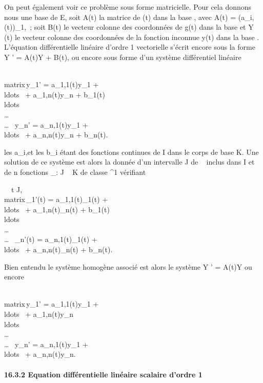 \documentclass[]{article}
\begin{document}
On peut également voir ce problème sous forme matricielle. Pour cela
donnons nous  une base de E, soit A(t) la matrice de \ell(t) dans la base
, avec A(t) = (a\_i,\jmath(t))\_1\leqi,\jmath\leqn~; soit B(t) le
vecteur colonne des coordonnées de g(t) dans la base  et Y (t) le
vecteur colonne des coordonnées de la fonction inconnue y(t) dans la
base . L'équation différentielle linéaire d'ordre 1 vectorielle s'écrit
encore sous la forme Y ' = A(t)Y + B(t), ou encore sous forme d'un
système différentiel linéaire

\left
\\matrix\,y\_1'
= a\_1,1(t)y\_1 +
\\ldots~ +
a\_1,n(t)y\_n + b\_1(t) \cr
\\ldots\\\ldots\\\ldots~
\cr y\_n' = a\_n,1(t)y\_1 +
\\ldots~ +
a\_n,n(t)y\_n + b\_n(t)\right .

les a\_i,\jmath et les b\_i étant des fonctions continues de
I dans le corps de base K. Une solution de ce système est alors la
donnée d'un intervalle J de ~ inclus dans I et de n fonctions
\phi\_\jmath : J \rightarrow~ K de classe ^1 vérifiant

\forall~~t \in J,\quad
\left
\\matrix\,\phi\_1'(t)
= a\_1,1(t)\phi\_1(t) +
\\ldots~ +
a\_1,n(t)\phi\_n(t) + b\_1(t) \cr
\\ldots\\\ldots\\\ldots~
\cr \phi\_n'(t) = a\_n,1(t)\phi\_1(t) +
\\ldots~ +
a\_n,n(t)\phi\_n(t) +
b\_n(t)\right .

Bien entendu le système homogène associé est alors le système Y ' =
A(t)Y ou encore

\left
\\matrix\,y\_1'
= a\_1,1(t)y\_1 +
\\ldots~ +
a\_1,n(t)y\_n \cr
\\ldots\\\ldots\\\ldots~
\cr y\_n' = a\_n,1(t)y\_1 +
\\ldots~ +
a\_n,n(t)y\_n\right .

\paragraph{16.3.2 Equation différentielle linéaire scalaire d'ordre 1}
\end{document}
